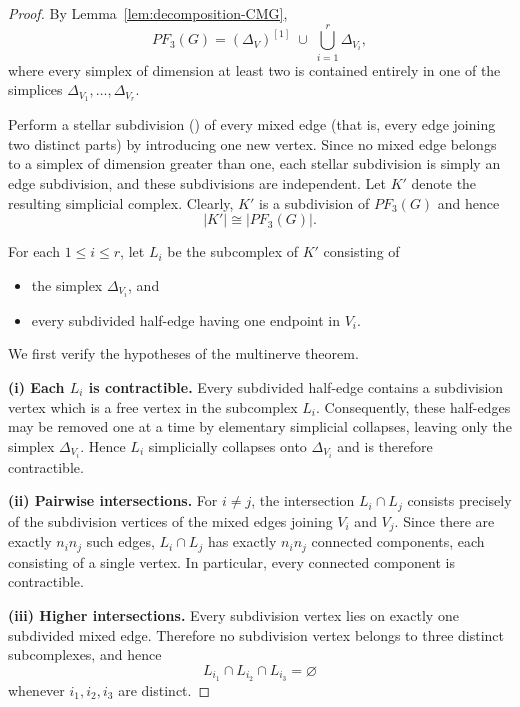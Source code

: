 \documentclass[12pt,reqno]{amsart}
\theoremstyle{definition}
\begin{document}
\begin{proof}
By Lemma~\ref{lem:decomposition-CMG},
\[
PF_3(G)
=
(\Delta_V)^{[1]}
\;\cup\;
\bigcup_{i=1}^r\Delta_{V_i},
\]
where every simplex of dimension at least two is contained entirely in one of the simplices
$\Delta_{V_1},\ldots,\Delta_{V_r}$.

Perform a stellar subdivision (\cite[Definition 2.22]{kozlov2007}) of every mixed edge (that is, every edge joining two distinct parts) by introducing one new vertex. 
Since no mixed edge belongs to a simplex of dimension greater than one, each stellar subdivision is simply an edge subdivision, and these subdivisions are independent. 
Let $K'$ denote the resulting simplicial complex. Clearly,
$K'$ is a subdivision of $PF_3(G)$ and hence
\[
|K'|\cong |PF_3(G)|.
\]

For each $1\le i\le r$, let $L_i$ be the subcomplex of $K'$ consisting of
\begin{itemize}
    \item the simplex $\Delta_{V_i}$, and
    \item every subdivided half-edge having one endpoint in $V_i$.
\end{itemize}

We first verify the hypotheses of the multinerve theorem.

\smallskip

\noindent
\textbf{(i) Each $L_i$ is contractible.}
Every subdivided half-edge contains a subdivision vertex which is a free vertex in the subcomplex $L_i$. 
Consequently, these half-edges may be removed one at a time by elementary simplicial collapses, leaving only the simplex $\Delta_{V_i}$. Hence $L_i$ simplicially collapses onto $\Delta_{V_i}$ and is therefore contractible.

\smallskip

\noindent
\textbf{(ii) Pairwise intersections.}
For $i\neq j$, the intersection
$L_i\cap L_j$
consists precisely of the subdivision vertices of the mixed edges joining $V_i$ and $V_j$. Since there are exactly $n_in_j$ such edges,
$L_i\cap L_j$
has exactly $n_in_j$ connected components, each consisting of a single vertex. In particular, every connected component is contractible.

\smallskip

\noindent
\textbf{(iii) Higher intersections.}
Every subdivision vertex lies on exactly one subdivided mixed edge. Therefore no subdivision vertex belongs to three distinct subcomplexes, and hence
\[
L_{i_1}\cap L_{i_2}\cap L_{i_3}=\varnothing
\]
whenever $i_1,i_2,i_3$ are distinct.


\end{proof}
\end{document}
